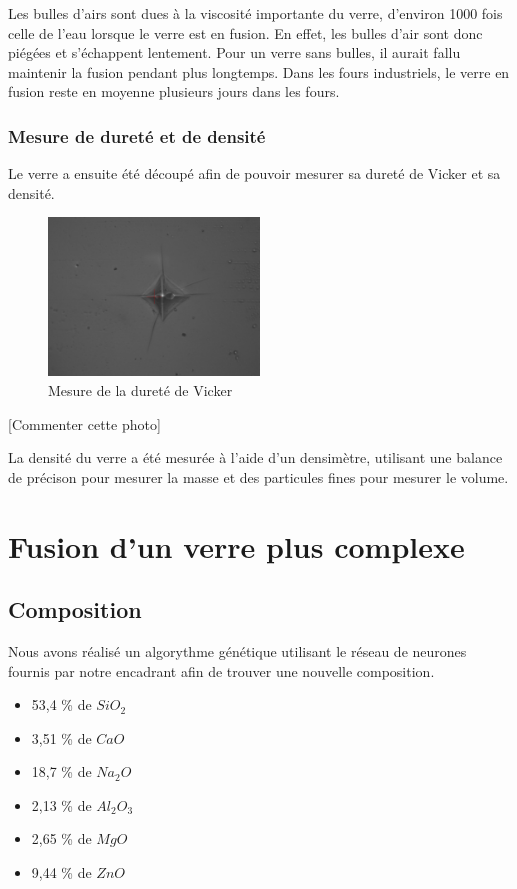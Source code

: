 \documentclass{article}
\begin{document}
Les bulles d'airs sont dues à la viscosité importante du verre, d'environ 1000 fois celle de l'eau lorsque le verre est en fusion. En effet, les bulles d'air sont donc piégées et s'échappent lentement. Pour un verre sans bulles, il aurait fallu maintenir la fusion pendant plus longtemps. Dans les fours industriels, le verre en fusion reste en moyenne plusieurs jours dans les fours.

\subsubsection{Mesure de dureté et de densité}

Le verre a ensuite été découpé afin de pouvoir mesurer sa dureté de Vicker et sa densité. 


\begin{figure}[h]
    \centering
    \includegraphics[width=0.5\textwidth]{photos/dureté.jpg}
    \caption{Mesure de la dureté de Vicker}
\end{figure}

[Commenter cette photo]


La densité du verre a été mesurée à l'aide d'un densimètre, utilisant une balance de précison pour mesurer la masse et des particules fines pour mesurer le volume. 

\section{Fusion d'un verre plus complexe}

\subsection{Composition}

Nous avons réalisé un algorythme génétique utilisant le réseau de neurones fournis par notre encadrant afin de trouver une nouvelle composition. 

\begin{itemize}
    \item 53,4 \% de $SiO_2$
    \item 3,51 \% de $CaO$
    \item 18,7 \% de $Na_2O$
    \item 2,13 \% de $Al_2O_3$
    \item 2,65 \% de $MgO$
    \item 9,44 \% de $ZnO$
\end{itemize}
\end{document}
